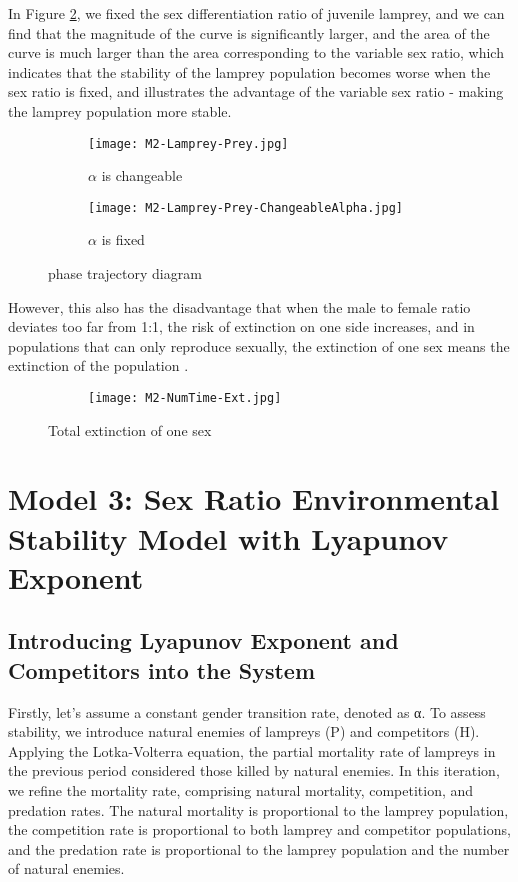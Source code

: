 \documentclass[12pt]{article}  %
\begin{document}
In Figure \ref{subfig:M2-Lamprey-Prey-ChangeableAlpha}, we fixed the sex differentiation ratio of juvenile lamprey, and we can find that the magnitude of the curve is significantly larger, and the area of the curve is much larger than the area corresponding to the variable sex ratio, which indicates that the stability of the lamprey population becomes worse when the sex ratio is fixed, and illustrates the advantage of the variable sex ratio - making the lamprey population more stable.
\begin{figure}[htbp]
	\centering
	\begin{subfigure}[b]{.45\textwidth}
		\texttt{[image: M2-Lamprey-Prey.jpg]}
		\caption{$\alpha$ is changeable}\label{subfig:M2-Lamprey-Prey}
	\end{subfigure}
	\begin{subfigure}[b]{.45\textwidth}
		\texttt{[image: M2-Lamprey-Prey-ChangeableAlpha.jpg]}
		\caption{$\alpha$ is fixed}\label{subfig:M2-Lamprey-Prey-ChangeableAlpha}
	\end{subfigure}
	\caption{phase trajectory diagram}\label{fig:07}
\end{figure}

However, this also has the disadvantage that when the male to female ratio deviates too far from 1:1, the risk of extinction on one side increases, and in populations that can only reproduce sexually, the extinction of one sex means the extinction of the population \cite{11}.
\begin{figure}[htbp]
	\centering
	\begin{subfigure}[b]{.6\textwidth}
		\texttt{[image: M2-NumTime-Ext.jpg]}\label{M2-NumTime-Ext}
	\end{subfigure}
	\caption{Total extinction of one sex}\label{fig:08}
\end{figure}

\section{Model 3: Sex Ratio Environmental Stability Model with Lyapunov Exponent}
\subsection{Introducing Lyapunov Exponent and Competitors into the System}
Firstly, let's assume a constant gender transition rate, denoted as α. To assess stability, we introduce natural enemies of lampreys (P) and competitors (H). Applying the Lotka-Volterra equation, the partial mortality rate of lampreys in the previous period considered those killed by natural enemies. In this iteration, we refine the mortality rate, comprising natural mortality, competition, and predation rates. The natural mortality is proportional to the lamprey population, the competition rate is proportional to both lamprey and competitor populations, and the predation rate is proportional to the lamprey population and the number of natural enemies.
\end{document}
